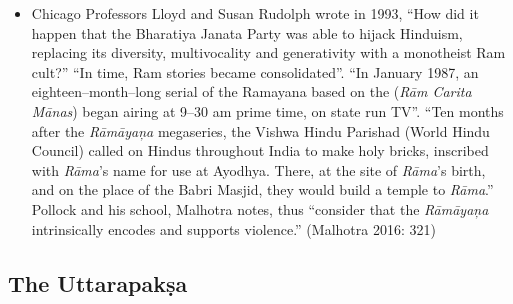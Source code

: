\begin{itemize}
 \item Chicago Professors Lloyd and Susan Rudolph wrote in 1993, “How did it happen that the Bharatiya Janata Party was able to hijack Hinduism, replacing its diversity, multivocality and generativity with a monotheist Ram cult?” “In time, Ram stories became consolidated”. “In January 1987, an eighteen–month–long serial of the Ramayana based on the (\textit{Rām Carita Mānas}) began airing at 9–30 am prime time, on state run TV”. “Ten months after the \textit{Rāmāyaņa} megaseries, the Vishwa Hindu Parishad (World Hindu Council) called on Hindus throughout India to make holy bricks, inscribed with \textit{Rāma}’s name for use at Ayodhya. There, at the site of \textit{Rāma}’s birth, and on the place of the Babri Masjid, they would build a temple to \textit{Rāma}.” Pollock and his school, Malhotra notes, thus “consider that the \textit{Rāmāyaņa} intrinsically encodes and supports violence.” (Malhotra 2016: 321)

\end{itemize}


\subsection*{The Uttarapakṣa}

